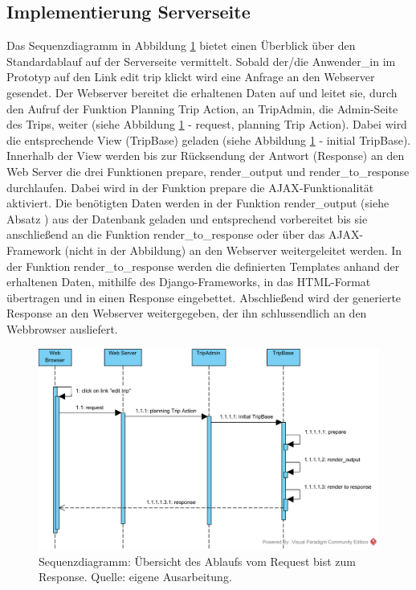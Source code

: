 \documentclass[Bachelorarbeit.tex]{subfiles}
\begin{document}
\subsection{Implementierung Serverseite}
\label{implServer}


Das Sequenzdiagramm in Abbildung \ref{fig:Overview} bietet einen Überblick über den Standardablauf auf der Serverseite vermittelt. 
Sobald der/die Anwender\_in im  Prototyp auf den Link edit trip klickt wird eine  Anfrage an den Webserver gesendet.
Der Webserver bereitet die erhaltenen Daten auf und leitet sie, durch den Aufruf der Funktion Planning Trip Action, an TripAdmin, die Admin-Seite des Trips, weiter (siehe Abbildung \ref{fig:Overview} - request, planning Trip Action). 
Dabei wird die entsprechende View (TripBase) geladen (siehe Abbildung \ref{fig:Overview} - initial TripBase).
Innerhalb der View werden bis zur Rücksendung der Antwort (Response) an den Web Server die drei Funktionen prepare, render\_output und render\_to\_response durchlaufen. 
Dabei wird in der Funktion prepare die \ac{AJAX}-Funktionalität aktiviert.
Die benötigten Daten werden in der Funktion render\_output (siehe Absatz ) aus der Datenbank geladen und entsprechend vorbereitet bis sie anschließend an die Funktion render\_to\_response oder über das \ac{AJAX}-Framework (nicht in der Abbildung) an den Webserver weitergeleitet werden.
In der Funktion render\_to\_response werden die definierten Templates anhand der erhaltenen Daten, mithilfe des Django-Frameworks, in das \ac{HTML}-Format übertragen und in einen Response eingebettet.
Abschließend wird der generierte Response an den Webserver weitergegeben, der ihn schlussendlich an den Webbrowser ausliefert.


\begin{figure}[h]
\centering
\includegraphics[width=1\linewidth]{img/Implementierung/Overview}
\caption[Sequenzdiagramm: Request bis Response]{Sequenzdiagramm: Übersicht des Ablaufs vom Request bist zum Response. Quelle: eigene Ausarbeitung.}
\label{fig:Overview}
\end{figure}
\end{document}
